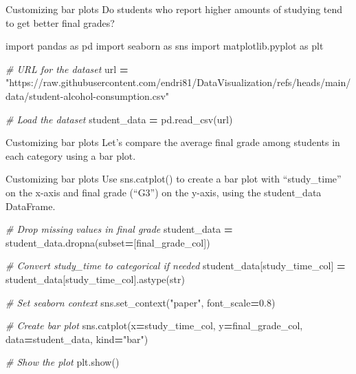 \documentclass[
  ignorenonframetext,
]{beamer}
\newenvironment{Shaded}{\begin{snugshade}}{\end{snugshade}}
\newcommand{\BuiltInTok}[1]{#1}
\newcommand{\CommentTok}[1]{\textcolor[rgb]{0.56,0.35,0.01}{\textit{#1}}}
\newcommand{\FloatTok}[1]{\textcolor[rgb]{0.00,0.00,0.81}{#1}}
\newcommand{\ImportTok}[1]{#1}
\newcommand{\NormalTok}[1]{#1}
\newcommand{\OperatorTok}[1]{\textcolor[rgb]{0.81,0.36,0.00}{\textbf{#1}}}
\newcommand{\StringTok}[1]{\textcolor[rgb]{0.31,0.60,0.02}{#1}}
\begin{document}
\begin{frame}[fragile]{Customizing bar plots}
\label{customizing-bar-plots-1}
Do students who report higher amounts of studying tend to get better
final grades?


\begin{Shaded}
\begin{Highlighting}[]
\ImportTok{import}\NormalTok{ pandas }\ImportTok{as}\NormalTok{ pd}
\ImportTok{import}\NormalTok{ seaborn }\ImportTok{as}\NormalTok{ sns}
\ImportTok{import}\NormalTok{ matplotlib.pyplot }\ImportTok{as}\NormalTok{ plt}

\CommentTok{\# URL for the dataset}
\NormalTok{url }\OperatorTok{=} \StringTok{"https://raw.githubusercontent.com/endri81/DataVisualization/refs/heads/main/data/student{-}alcohol{-}consumption.csv"}

\CommentTok{\# Load the dataset}
\NormalTok{student\_data }\OperatorTok{=}\NormalTok{ pd.read\_csv(url)}
\end{Highlighting}
\end{Shaded}
\end{frame}

\begin{frame}{Customizing bar plots}
\label{customizing-bar-plots-2}
Let's compare the average final grade among students in each category
using a bar plot.
\end{frame}

\begin{frame}[fragile]{Customizing bar plots}
\label{customizing-bar-plots-3}
Use sns.catplot() to create a bar plot with ``study\_time'' on the
x-axis and final grade (``G3'') on the y-axis, using the student\_data
DataFrame.


\begin{Shaded}
\begin{Highlighting}[]
\CommentTok{\# Drop missing values in final grade}
\NormalTok{student\_data }\OperatorTok{=}\NormalTok{ student\_data.dropna(subset}\OperatorTok{=}\NormalTok{[final\_grade\_col])}

\CommentTok{\# Convert study\_time to categorical if needed}
\NormalTok{student\_data[study\_time\_col] }\OperatorTok{=}\NormalTok{ student\_data[study\_time\_col].astype(}\BuiltInTok{str}\NormalTok{)}

\CommentTok{\# Set seaborn context}
\NormalTok{sns.set\_context(}\StringTok{"paper"}\NormalTok{, font\_scale}\OperatorTok{=}\FloatTok{0.8}\NormalTok{)}

\CommentTok{\# Create bar plot}
\NormalTok{sns.catplot(x}\OperatorTok{=}\NormalTok{study\_time\_col, y}\OperatorTok{=}\NormalTok{final\_grade\_col, }
\NormalTok{            data}\OperatorTok{=}\NormalTok{student\_data, kind}\OperatorTok{=}\StringTok{"bar"}\NormalTok{)}

\CommentTok{\# Show the plot}
\NormalTok{plt.show()}
\end{Highlighting}
\end{Shaded}
\end{frame}
\end{document}
